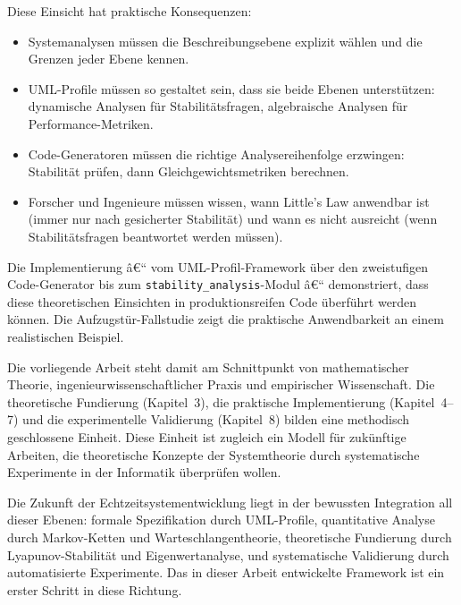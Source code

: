 ﻿\documentclass[a4paper,12pt]{scrreprt}
\theoremstyle{definition}
\begin{document}
Diese Einsicht hat praktische Konsequenzen:
\begin{itemize}
	\item[-] Systemanalysen müssen die Beschreibungsebene explizit wählen
	und die Grenzen jeder Ebene kennen.
	\item[-] UML-Profile müssen so gestaltet sein, dass sie beide Ebenen
	unterstützen: dynamische Analysen für Stabilitätsfragen,
	algebraische Analysen für Performance-Metriken.
	\item[-] Code-Generatoren müssen die richtige Analysereihenfolge
	erzwingen: Stabilität prüfen, dann Gleichgewichtsmetriken
	berechnen.
	\item[-] Forscher und Ingenieure müssen wissen, wann Little's Law
	anwendbar ist (immer nur nach gesicherter Stabilität) und
	wann es nicht ausreicht (wenn Stabilitätsfragen beantwortet
	werden müssen).
\end{itemize}

Die Implementierung â€“ vom UML-Profil-Framework über den zweistufigen
Code-Generator bis zum \texttt{stability\_analysis}-Modul â€“ demonstriert,
dass diese theoretischen Einsichten in produktionsreifen Code überführt
werden können.  Die Aufzugstür-Fallstudie zeigt die praktische
Anwendbarkeit an einem realistischen Beispiel.

Die vorliegende Arbeit steht damit am Schnittpunkt von mathematischer Theorie,
ingenieurwissenschaftlicher Praxis und empirischer Wissenschaft.  Die
theoretische Fundierung (Kapitel~3), die praktische Implementierung
(Kapitel~4--7) und die experimentelle Validierung (Kapitel~8) bilden eine
methodisch geschlossene Einheit.  Diese Einheit ist zugleich ein Modell
für zukünftige Arbeiten, die theoretische Konzepte der Systemtheorie durch
systematische Experimente in der Informatik überprüfen wollen.

Die Zukunft der Echtzeitsystementwicklung liegt in der bewussten Integration
all dieser Ebenen: formale Spezifikation durch UML-Profile, quantitative
Analyse durch Markov-Ketten und Warteschlangentheorie, theoretische Fundierung
durch Lyapunov-Stabilität und Eigenwertanalyse, und systematische Validierung
durch automatisierte Experimente.  Das in dieser Arbeit entwickelte Framework
ist ein erster Schritt in diese Richtung.
\end{document}
